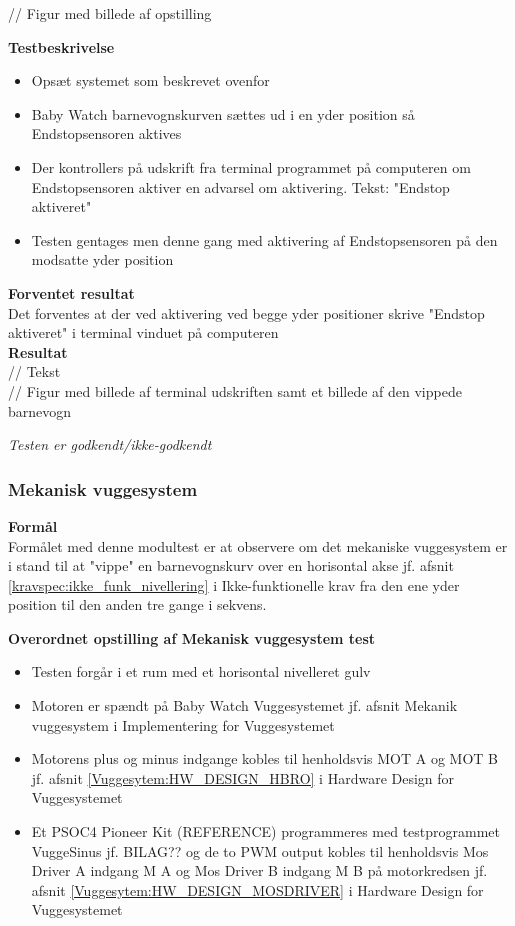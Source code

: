 // Figur med billede af opstilling

\textbf{Testbeskrivelse}
\begin{itemize}
	\item Opsæt systemet som beskrevet ovenfor
	\item Baby Watch barnevognskurven sættes ud i en yder position så Endstopsensoren aktives
	\item Der kontrollers på udskrift fra terminal programmet på computeren om Endstopsensoren aktiver en advarsel om aktivering. Tekst: "Endstop aktiveret"
	\item Testen gentages men denne gang med aktivering af Endstopsensoren på den modsatte yder position
\end{itemize}

\textbf{Forventet resultat} \\
Det forventes at der ved aktivering ved begge yder positioner skrive "Endstop aktiveret" i terminal vinduet på computeren \\
\textbf{Resultat} \\
// Tekst \\

// Figur med billede af terminal udskriften samt et billede af den vippede barnevogn

\textit{Testen er godkendt/ikke-godkendt}



\subsubsection{Mekanisk vuggesystem}
\textbf{Formål} \\
Formålet med denne modultest er at observere om det mekaniske vuggesystem er i stand til at "vippe" en barnevognskurv over en horisontal akse jf. afsnit \ref{kravspec:ikke_funk_nivellering} i Ikke-funktionelle krav fra den ene yder position til den anden tre gange i sekvens. 

\textbf{Overordnet opstilling af Mekanisk vuggesystem test}

\begin{itemize}
	\item Testen forgår i et rum med et horisontal nivelleret gulv
	\item Motoren er spændt på Baby Watch Vuggesystemet jf. afsnit Mekanik vuggesystem i Implementering for Vuggesystemet
	\item Motorens plus og minus indgange kobles til henholdsvis MOT A og MOT B jf. afsnit \ref{Vuggesytem:HW_DESIGN_HBRO} i Hardware Design for Vuggesystemet
	\item Et PSOC4 Pioneer Kit (REFERENCE) programmeres med testprogrammet VuggeSinus jf. BILAG?? og de to PWM output kobles til henholdsvis Mos Driver A indgang M A og Mos Driver B indgang M B på motorkredsen jf. afsnit \ref{Vuggesytem:HW_DESIGN_MOSDRIVER} i Hardware Design for Vuggesystemet
\end{itemize}

